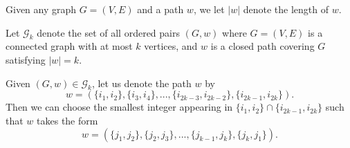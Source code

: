 \begin{definition}
  \label{def:length_of_w}
  \uses{}
  Given any graph $G=(V,E)$ and a path $w$, we let $|w|$ denote the length of $w$. 
\end{definition}
\begin{definition}
  \label{def:g_k}
  Let $\mathcal{G}_k$ denote the set of all ordered pairs $(G,w)$ where $G = (V,E)$ is a connected graph with at most $k$ vertices, and
  $w$ is a closed path covering $G$ satisfying $|w| = k$.
\end{definition}
\begin{lemma}
  \label{lem:w_unique}
  Given $(G,w) \in \mathcal{G}_k$, let us denote the path $w$ by
  \[
  w = (\{i_1,i_2\},\{i_3,i_4\},...,\{i_{2k-3},i_{2k-2}\},\{i_{2k-1},i_{2k}\}).
  \] 
  Then we can choose the smallest integer appearing in $\{i_1,i_2\} \cap \{i_{2k-1},i_{2k}\}$ such that $w$ takes the form
  \begin{equation}\label{equation_w_unique}
  w = (\{j_1,j_2\},\{j_2,j_3\},...,\{j_{k-1},j_k\},\{j_k,j_1\}).
  \end{equation} 
\end{lemma}
